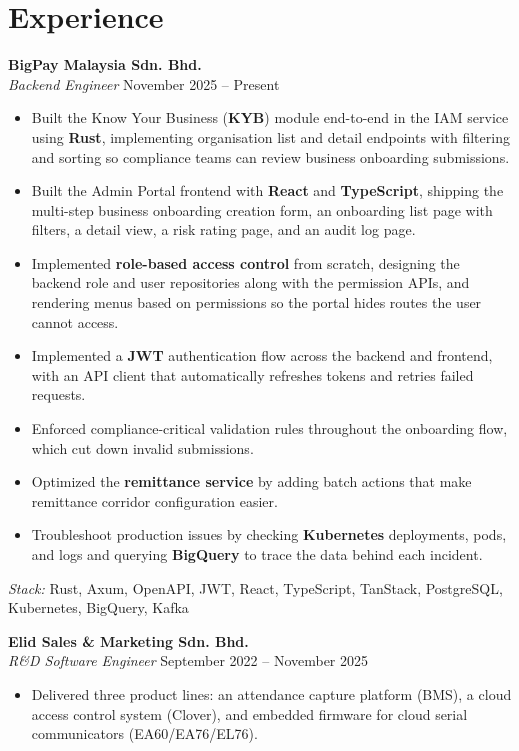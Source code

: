 \documentclass[11pt]{article}
\begin{document}
\section{Experience}

\textbf{BigPay Malaysia Sdn. Bhd.}\\
\textit{Backend Engineer} \hfill November 2025 -- Present

\begin{itemize}
  \item Built the Know Your Business (\textbf{KYB}) module end-to-end in the IAM service using \textbf{Rust}, implementing organisation list and detail endpoints with filtering and sorting so compliance teams can review business onboarding submissions.
  \item Built the Admin Portal frontend with \textbf{React} and \textbf{TypeScript}, shipping the multi-step business onboarding creation form, an onboarding list page with filters, a detail view, a risk rating page, and an audit log page.
  \item Implemented \textbf{role-based access control} from scratch, designing the backend role and user repositories along with the permission APIs, and rendering menus based on permissions so the portal hides routes the user cannot access.
  \item Implemented a \textbf{JWT} authentication flow across the backend and frontend, with an API client that automatically refreshes tokens and retries failed requests.
  \item Enforced compliance-critical validation rules throughout the onboarding flow, which cut down invalid submissions.
  \item Optimized the \textbf{remittance service} by adding batch actions that make remittance corridor configuration easier.
  \item Troubleshoot production issues by checking \textbf{Kubernetes} deployments, pods, and logs and querying \textbf{BigQuery} to trace the data behind each incident.
\end{itemize}

\textit{Stack:} Rust, Axum, OpenAPI, JWT, React, TypeScript, TanStack, PostgreSQL, Kubernetes, BigQuery, Kafka

\textbf{Elid Sales \& Marketing Sdn. Bhd.}\\
\textit{R\&D Software Engineer} \hfill September 2022 -- November 2025

\begin{itemize}
  \item Delivered three product lines: an attendance capture platform (BMS), a cloud access control system (Clover), and embedded firmware for cloud serial communicators (EA60/EA76/EL76).
\end{itemize}
\end{document}
